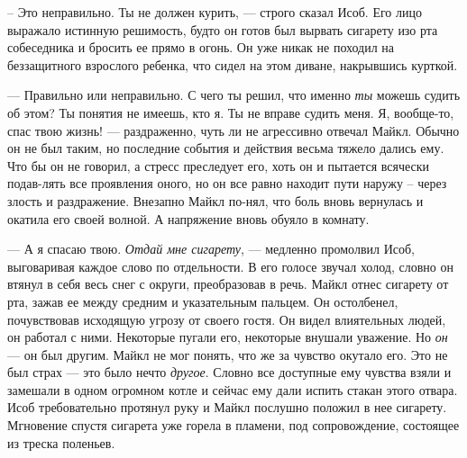 – Это неправильно. Ты не должен курить, — строго сказал Исоб. Его лицо выражало истинную решимость, будто он готов был вырвать сигарету изо рта собеседника и бросить ее прямо в огонь. Он уже никак не походил на беззащитного взрослого ребенка, что сидел на этом диване, накрывшись курткой. 

— Правильно или неправильно. С чего ты решил, что именно \textit{ты} можешь судить об этом? Ты понятия не имеешь, кто я. Ты не вправе судить меня. Я, вообще-то, спас твою жизнь! — раздраженно, чуть ли не агрессивно отвечал Майкл. 
Обычно он не был таким, но последние события и действия весьма тяжело дались ему. Что бы он не говорил, а стресс преследует его, хоть он и пытается всячески подав-лять все проявления оного, но он все равно находит пути наружу – через злость и раздражение. Внезапно Майкл по-нял, что боль вновь вернулась и окатила его своей волной. А напряжение вновь обуяло в комнату. 

— А я спасаю твою. \textit{Отдай мне сигарету}, — медленно промолвил Исоб, выговаривая каждое слово по отдельности. В его голосе звучал холод, словно он втянул в себя весь снег с округи, преобразовав в речь. Майкл отнес сигарету от рта, зажав ее между средним и указательным пальцем. Он остолбенел, почувствовав исходящую угрозу от своего гостя. Он видел влиятельных людей, он работал с ними. Некоторые пугали его, некоторые внушали уважение. Но \textit{он} — он был другим. Майкл не мог понять, что же за чувство окутало его. Это не был страх — это было нечто \textit{другое}. Словно все доступные ему чувства взяли и замешали в одном огромном котле и сейчас ему дали испить стакан этого отвара. Исоб требовательно протянул руку и Майкл послушно положил в нее сигарету. Мгновение спустя сигарета уже горела в пламени, под сопровождение, состоящее из треска поленьев.
\clearpage
{\begingroup
{}
\noindent
\endgroup}
\cleardoublepage
